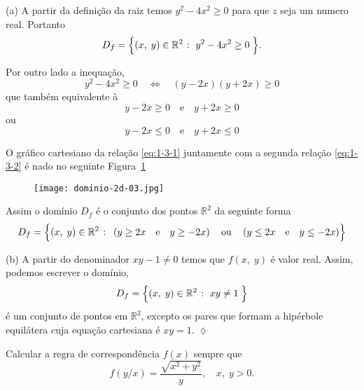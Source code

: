 \solo (a)  A partir da definição da raiz temos \(y^{2}-4x^{2} \geq 0\) para que  \(z\) seja um numero real. Portanto
\begin{equation*}
	D_{f} = \Bigl\{(x,\; y) \in \mathbb{R}^{2}\; \colon\; y^{2}-4x^{2} \geq 0 \; \Bigr\}.
\end{equation*} 

Por outro lado a inequação,
\begin{equation*}
	y^{2}-4x^{2} \geq 0 \quad \Leftrightarrow \quad (y-2x)(y+2x) \geq 0
\end{equation*}
que também equivalente à
\begin{equation}\label{eq:1-3-1}
	y-2x \geq 0 \quad \textrm{e} \quad y+2x \geq 0
\end{equation}
ou 
\begin{equation}\label{eq:1-3-2}
	y-2x \leq 0 \quad \textrm{e} \quad y+2x \leq 0
\end{equation}

O gráfico cartesiano da relação \eqref{eq:1-3-1} juntamente com a segunda relação \eqref{eq:1-3-2} é nado no seguinte Figura~\ref{fig:1-6}
%
\begin{figure}[H]
	\centering
	\texttt{[image: dominio-2d-03.jpg]}
	\caption{}
	\label{fig:1-6}
\end{figure}
%

Assim o domínio \(D_{f}\) é o conjunto dos pontos \(\mathbb{R}^{2}\) da seguinte forma
\begin{equation*}
	D_{f} = \Bigl\{(x,\; y) \in \mathbb{R}^{2}\; \colon \; \left(y \geq 2x \quad \textrm{e} \quad y \geq -2x\right)
	\quad \textrm{ou}\quad \left(y \leq 2x \quad \textrm{e} \quad y \leq -2x\right) \Bigr\}
\end{equation*}

(b) A partir do denominador \( xy-1 \neq 0\) temos que \(f(x,\; y)\) é valor real. Assim, podemos escrever o domínio,
\begin{equation*}
	D_{f}= \Bigl\{(x,\; y)\in \mathbb{R}^{2}\; \colon\; xy \neq 1\; \Bigr\}
\end{equation*}
é um conjunto de pontos em \(\mathbb{R}^{2}\), excepto os pares que formam a hipérbole equilátera cuja equação cartesiana é \(xy=1\).  \hfill \(\lozenge\)

\begin{exer}\label{exe:1-3}
	Calcular a regra de correspondência $f(x)$ sempre que
	\begin{equation*}
		f(y/x)=\dfrac{\sqrt{x^2+y^2}}{y}, \quad x,\;  y>0.
	\end{equation*}	
\end{exer}

